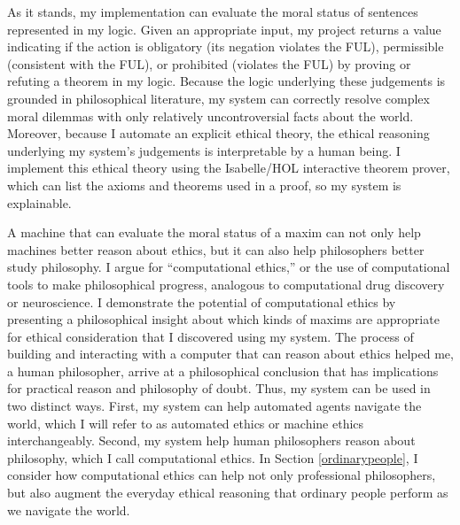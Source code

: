 \begin{isabellebody}
\begin{isamarkuptext}
As it stands, my implementation can evaluate the moral status of sentences represented in my logic. 
Given an appropriate input, my project returns a value indicating if the action is obligatory 
(its negation violates the FUL), permissible (consistent with the FUL), or prohibited (violates the FUL) 
by proving or refuting a theorem in my logic. Because the logic underlying these judgements is grounded
in philosophical literature, my system can correctly resolve complex moral dilemmas with only relatively uncontroversial
facts about the world. Moreover, because I automate an explicit ethical theory, the ethical reasoning 
underlying my system's judgements is interpretable by a human being. I implement this ethical theory 
using the Isabelle/HOL interactive theorem prover, which can list the axioms and theorems used in a 
proof, so my system is explainable. 

A machine that can evaluate the moral status of a maxim can not only help machines better reason about ethics, 
but it can also help philosophers better study philosophy. I argue for ``computational ethics,'' or the use of computational tools to 
make philosophical progress, analogous to computational drug discovery or neuroscience. 
I demonstrate the potential of computational ethics by presenting a 
philosophical insight about which kinds of maxims are appropriate for ethical consideration that I 
discovered using my system. The process of building and interacting with a computer that can reason 
about ethics helped me, a human philosopher, arrive at a philosophical conclusion that has implications for practical
reason and philosophy of doubt. Thus, my system can be used in two distinct ways. First, my system can help
automated agents navigate the world, which I will refer to as automated ethics or machine ethics interchangeably. Second, 
my system help human philosophers reason about philosophy, which I call computational ethics. In Section 
\ref{ordinarypeople}, I consider how computational ethics can help not only professional philosophers,
but also augment the everyday ethical reasoning that ordinary people perform as we navigate the world.%
\end{isamarkuptext}\isamarkuptrue%
%
\isadelimtheory
%
\endisadelimtheory
%
\isatagtheory
%
\endisatagtheory
{\isafoldtheory}%
%
\isadelimtheory
%
\endisadelimtheory
%
\end{isabellebody}%
\endinput
